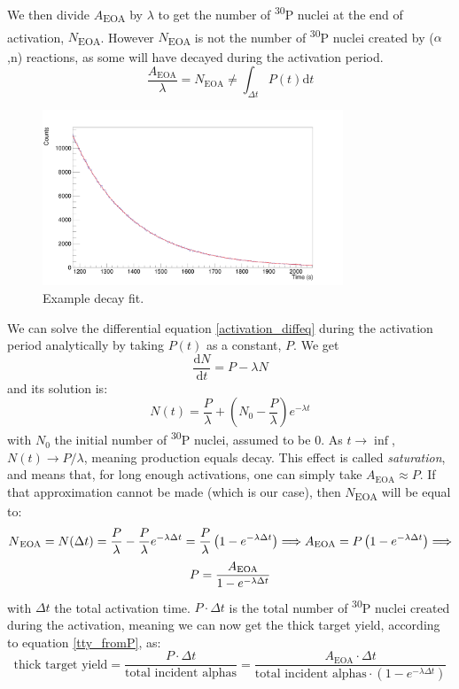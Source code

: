 \documentclass[a4paper,12pt]{report}
\newcommand{\dif}{\text{d}}
\newcommand{\ddt}[1]{\frac{\dif #1}{\dif t}}
\newcommand{\an}{($\alpha$,n) }
\newcommand{\Piso}{\textsuperscript{30}P }
\begin{document}
We then divide $A$\textsubscript{EOA} by $\lambda$ to get the number of \Piso nuclei at the end of activation, $N$\textsubscript{EOA}.
However $N$\textsubscript{EOA} is not the number of \Piso nuclei created by \an reactions, as some will have decayed during the activation period.
\[ \frac{A_\text{EOA}}{\lambda} = N_\text{EOA} \neq \int_{\Delta t}P(t) \dif t \]

\begin{figure}[H]
	\centering
	\includegraphics[width=0.80\textwidth]{example_decay_fit.png}
	\caption{Example decay fit.}
	\label{example_decay_fit}
\end{figure}

We can solve the differential equation \ref{activation_diffeq} during the activation period analytically by taking $P(t)$ as a constant, $P$.
We get
\begin{equation}
	\ddt{N} = P -\lambda N
\end{equation}
and its solution is:
\begin{equation}
	N(t) = \frac{P}{\lambda} + \left(  N_0 - \frac{P}{\lambda}  \right) e^{-\lambda t}
	\label{activation_constantP_solution}
\end{equation}
with $N_0$ the initial number of \Piso nuclei, assumed to be \num{0}.
As $t\longrightarrow\inf$, $N(t)\longrightarrow P/\lambda$, meaning production equals decay.
This effect is called \textit{saturation}, and means that, for long enough activations, one can simply take $A_\text{EOA}\approx P$.
If that approximation cannot be made (which is our case), then $N$\textsubscript{EOA} will be equal to:
\[ N\textsubscript{EOA} =N(\Delta t) = \frac{P}{\lambda} - \frac{P}{\lambda} e^{-\lambda \Delta t} = \frac{P}{\lambda} \left(1 - e^{-\lambda \Delta t} \right)\Longrightarrow A\textsubscript{EOA}=P\left(1-e^{-\lambda\Delta t}\right)\Longrightarrow \]
\begin{equation}
	P = \frac{A\textsubscript{EOA}}{1 - e^{-\lambda \Delta t}}
\end{equation}
with $\Delta t$ the total activation time.
$P\cdot\Delta t$ is the total number of \Piso nuclei created during the activation, meaning we can now get the thick target yield, according to equation \ref{tty_fromP}, as:
\begin{equation}
	\text{thick target yield} = \frac{P\cdot \Delta t}{\text{total incident alphas}} = \frac{A_\text{EOA}\cdot \Delta t}{\text{total incident alphas} \cdot \left( 1-e^{-\lambda \Delta t}  \right)}
\end{equation}
\end{document}
